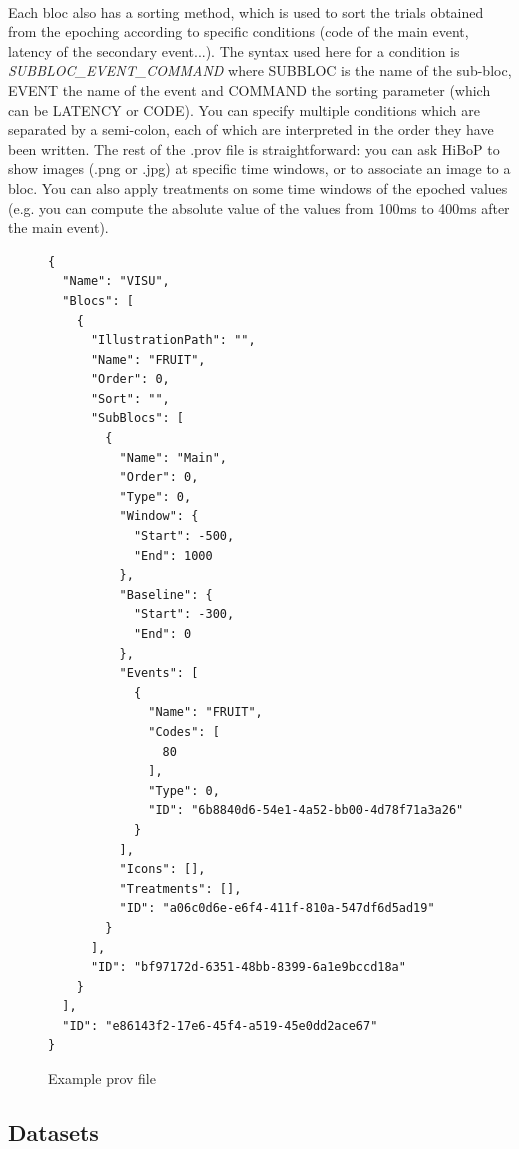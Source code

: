 \documentclass[a4paper]{article}
\begin{document}
\paragraph{} Each bloc also has a sorting method, which is used to sort the trials obtained from the epoching according to specific conditions (code of the main event, latency of the secondary event...). The syntax used here for a condition is \textit{SUBBLOC\_EVENT\_COMMAND} where SUBBLOC is the name of the sub-bloc, EVENT the name of the event and COMMAND the sorting parameter (which can be LATENCY or CODE). You can specify multiple conditions which are separated by a semi-colon, each of which are interpreted in the order they have been written. The rest of the .prov file is straightforward: you can ask HiBoP to show images (.png or .jpg) at specific time windows, or to associate an image to a bloc. You can also apply treatments on some time windows of the epoched values (e.g. you can compute the absolute value of the values from 100ms to 400ms after the main event).
\begin{figure}[H]
\begin{lstlisting}
{
  "Name": "VISU",
  "Blocs": [
    {
      "IllustrationPath": "",
      "Name": "FRUIT",
      "Order": 0,
      "Sort": "",
      "SubBlocs": [
        {
          "Name": "Main",
          "Order": 0,
          "Type": 0,
          "Window": {
            "Start": -500,
            "End": 1000
          },
          "Baseline": {
            "Start": -300,
            "End": 0
          },
          "Events": [
            {
              "Name": "FRUIT",
              "Codes": [
                80
              ],
              "Type": 0,
              "ID": "6b8840d6-54e1-4a52-bb00-4d78f71a3a26"
            }
          ],
          "Icons": [],
          "Treatments": [],
          "ID": "a06c0d6e-e6f4-411f-810a-547df6d5ad19"
        }
      ],
      "ID": "bf97172d-6351-48bb-8399-6a1e9bccd18a"
    }
  ],
  "ID": "e86143f2-17e6-45f4-a519-45e0dd2ace67"
}
\end{lstlisting}
\caption{\label{provFile}Example prov file}
\end{figure}
\subsection{Datasets}
\end{document}
